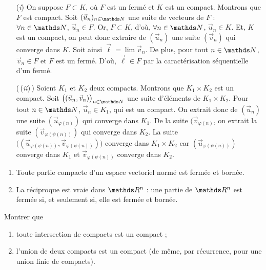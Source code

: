 \begin{prv}
	\begin{enumerate}
		\item[(\textit{i})] On suppose $F \subset K$, où $F$ est un fermé et $K$ est un compact.
			Montrons que $F$ est compact.
			Soit $(\vec{u}_n)_{n\in\N}$ une suite de vecteurs de $F$ : $\forall n \in \N$, $\vec{u}_n \in F$.
			Or, $F \subset K$, d'où, $\forall n \in \N$, $\vec{u}_n \in K$.
			Et, $K$ est un compact, on peut donc extraire de $(\vec{u}_n)$ une suite $(\vec{v}_n)$ qui converge dans $K$.
			Soit ainsi $\vec{\ell} = \lim \vec{v}_n$.
			De plus, pour tout $n \in \N$, $\vec{v}_n \in F$ et $F$ est un fermé.
			D'où, $\vec{\ell} \in F$ par la caractérisation séquentielle d'un fermé.
		\item[(\!\,\!(\textit{ii})\!\,\!)]
			Soient $K_1$ et $K_2$ deux compacts.
			Montrons que $K_1 \times K_2$ est un compact.
			Soit $\big((\vec{u}_n, \vec{v}_n)\big)_{n \in \N}$ une suite d'éléments de $K_1 \times K_2$.
			Pour tout $n \in \N$, $\vec{u}_n \in K_1$, qui est un compact.
			On extrait donc de $(\vec{u}_n)$ une suite $(\vec{u}_{\varphi(n)})$ qui converge dans $K_1$.
			De la suite $(\vec{v}_{\varphi(n)}$, on extrait la suite $(\vec{v}_{\varphi(\psi(n))})$ qui converge dans $K_2$.
			La suite $\big((\vec{u}_{\varphi(\psi(n))}, \vec{v}_{\varphi(\psi(n))})\big)$ converge dans $K_1 \times K_2$ car $(\vec{u}_{\varphi(\psi(n))})$ converge dans $K_1$ et $\vec{v}_{\varphi(\psi(n))}$ converge dans $K_2$.
	\end{enumerate}
\end{prv}

\begin{prop}
	\begin{enumerate}[label=(\textit{\roman*})]
		\item Toute partie compacte d'un espace vectoriel normé est fermée et bornée.
		\item La réciproque est vraie dans $\R^n$ : une partie de $\R^n$ est fermée si, et seulement si, elle est fermée et bornée.
	\end{enumerate}
\end{prop}

\begin{exo}
	\begin{slshape}
		Montrer que
		\begin{enumerate}[label=(\textit{\alph*})]
			\item toute intersection de compacts est un compact ;
			\item l'union de deux compacts est un compact (de même, par récurrence, pour une union finie de compacts).
		\end{enumerate}
	\end{slshape}
\end{exo}

